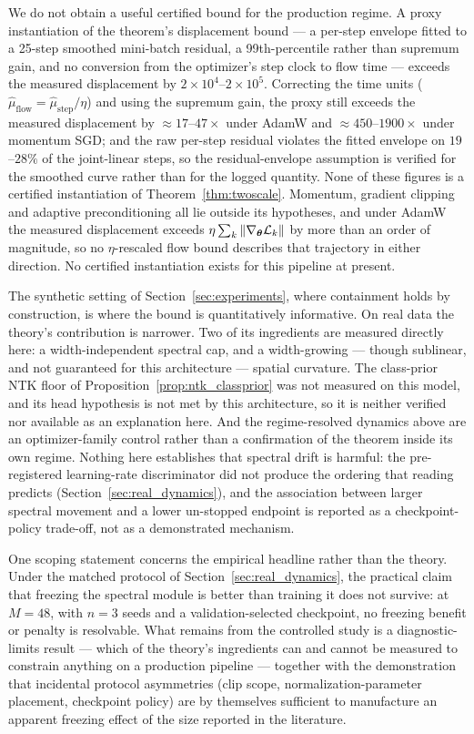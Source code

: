 We do not obtain a useful certified bound for the production regime. A
proxy instantiation of the theorem's displacement bound --- a per-step
envelope fitted to a 25-step smoothed mini-batch residual, a
99th-percentile rather than supremum gain, and no conversion from the
optimizer's step clock to flow time --- exceeds the measured
displacement by $2 \times 10^{4}$--$2 \times 10^{5}$. Correcting the
time units ($\hat\mu_{\mathrm{flow}} = \hat\mu_{\mathrm{step}}/\eta$)
and using
the supremum gain, the proxy still exceeds the measured displacement by
$\approx 17$--$47\times$ under AdamW and $\approx 450$--$1900\times$
under momentum SGD; and the raw per-step residual violates the fitted
envelope on $19$--$28\%$ of the joint-linear steps, so the
residual-envelope assumption is verified for the smoothed curve rather
than for the logged quantity.
None of these figures is a certified instantiation of
Theorem~\ref{thm:twoscale}. Momentum, gradient clipping and adaptive
preconditioning all lie outside its hypotheses, and under AdamW the
measured displacement exceeds
$\eta \sum_k \|\nabla_{{\boldsymbol{\theta}}}\mathcal{L}_k\|$ by more than an order of
magnitude, so no $\eta$-rescaled flow bound describes that trajectory
in either direction. No certified instantiation exists for this
pipeline at present.

The synthetic setting of Section~\ref{sec:experiments}, where
containment holds by construction, is where the bound is quantitatively
informative. On real data the theory's contribution is narrower. Two of
its ingredients are measured directly here: a width-independent
spectral cap, and a width-growing --- though sublinear, and not
guaranteed for this architecture --- spatial curvature. The class-prior
NTK floor of Proposition~\ref{prop:ntk_classprior} was not measured on
this model, and its head hypothesis is not met by this architecture, so
it is neither verified nor available as an explanation here. And the
regime-resolved dynamics above are an optimizer-family control rather
than a confirmation of the theorem inside its own regime. Nothing here
establishes that spectral drift is harmful: the pre-registered
learning-rate discriminator did not produce the ordering that reading
predicts (Section~\ref{sec:real_dynamics}), and the association between
larger spectral movement and a lower un-stopped endpoint is reported as
a checkpoint-policy trade-off, not as a demonstrated mechanism.

One scoping statement concerns the empirical headline rather than the
theory. Under the matched protocol of
Section~\ref{sec:real_dynamics}, the practical claim that freezing the
spectral module is better than training it does not survive: at
$M{=}48$, with $n=3$ seeds and a validation-selected checkpoint, no
freezing benefit
or penalty is resolvable. What remains from the controlled study is a
diagnostic-limits result --- which of the theory's ingredients can and
cannot be measured to constrain anything on a production pipeline ---
together with the demonstration that incidental protocol asymmetries
(clip scope, normalization-parameter placement, checkpoint policy) are
by themselves sufficient to manufacture an apparent freezing effect of
the size reported in the literature.

